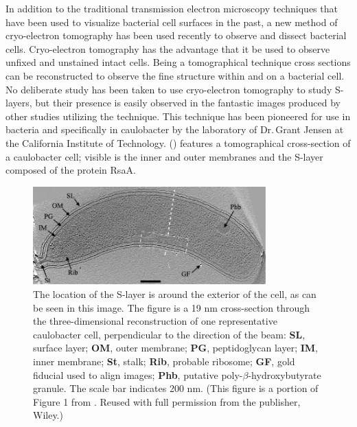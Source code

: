 In addition to the traditional transmission electron microscopy techniques that have been used to
visualize bacterial cell surfaces in the past, a new method of cryo-electron tomography has been
used recently to observe and dissect bacterial cells. Cryo-electron tomography has the advantage
that it be used to observe unfixed and unstained intact cells. Being a tomographical technique cross
sections can be reconstructed to observe the fine structure within and on a bacterial cell. No
deliberate study has been taken to use cryo-electron tomography to study \acp{S-layer}, but their
presence is easily observed in the fantastic images produced by other studies utilizing the
technique. This technique has been pioneered for use in bacteria and specifically in \ac{caulobacter} by the laboratory of Dr.\,Grant Jensen at the California Institute of Technology.  () features a tomographical cross-section of a \ac{caulobacter} cell; visible is the inner and outer membranes and the \ac{S-layer} composed of the protein RsaA.

\begin{figure}[htb]
  \begin{center}
    \includegraphics[width=0.8\textwidth]{intro/img/jensentomograph.jpg}
  \end{center}
  \caption[Electrotomograph of \ac{caulobacter}]{ The location of the \ac{S-layer} is around the
    exterior of the cell, as can be seen in this image. The figure is a 19 \si{\nano\meter}
    cross-section through the three-dimensional reconstruction of one representative
    \ac{caulobacter} cell, perpendicular to the direction of the beam: \textbf{SL}, surface layer;
    \textbf{OM}, outer membrane; \textbf{PG}, peptidoglycan layer; \textbf{IM}, inner membrane;
    \textbf{St}, stalk; \textbf{Rib}, probable ribosome; \textbf{GF}, gold fiducial used to align
    images; \textbf{Phb}, putative poly-$\beta$-hydroxybutyrate granule. The scale bar indicates 200 \si{\nano\meter}. (This figure is a portion of Figure 1 from . Reused
    with full permission from the publisher, Wiley.)}
  \label{fig:intro-tomo}
\end{figure}

